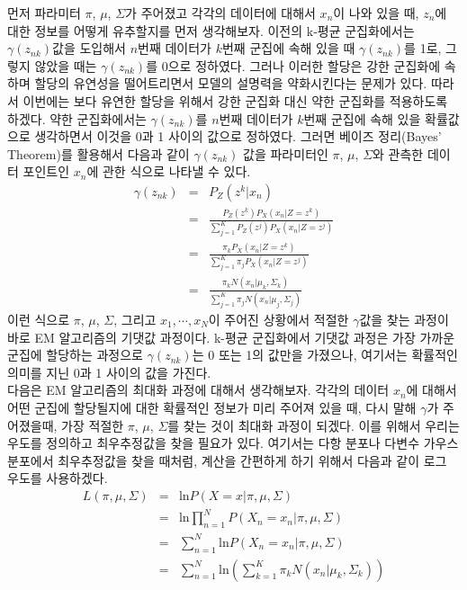\documentclass[a4paper]{oblivoir}
\begin{document}
먼저 파라미터 $\pi$, ${\mu}$, ${\Sigma}$가 주어졌고 각각의 데이터에 대해서 $x_n$이 나와 있을 때, $z_n$에 대한 정보를 어떻게 유추할지를 먼저 생각해보자. 이전의 k-평균 군집화에서는 $\gamma(z_{nk})$값을 도입해서 $n$번째 데이터가 $k$번째 군집에 속해 있을 때 $\gamma(z_{nk})$를 1로, 그렇지 않았을 때는 $\gamma(z_{nk})$를 0으로 정하였다. 그러나 이러한 할당은 강한 군집화에 속하며 할당의 유연성을 떨어트리면서 모델의 설명력을 약화시킨다는 문제가 있다. 따라서 이번에는 보다 유연한 할당을 위해서 강한 군집화 대신 약한 군집화를 적용하도록 하겠다. 약한 군집화에서는 $\gamma(z_{nk})$를 $n$번째 데이터가 $k$번째 군집에 속해 있을 확률값으로 생각하면서 이것을 0과 1 사이의 값으로 정하였다. 그러면 베이즈 정리(Bayes' Theorem)를 활용해서 다음과 같이 $\gamma(z_{nk})$ 값을 파라미터인 $\pi$, ${\mu}$, ${\Sigma}$와 관측한 데이터 포인트인 $x_n$에 관한 식으로 나타낼 수 있다.  
\begin{eqnarray}
\gamma(z_{nk}) & = & P_{Z}(z^{k}|x_{n}) \nonumber \\ 
& = & \frac{ P_{Z}(z^{k})P_{X}(x_{n}|Z=z^{k}) }{ \sum_{j=1}^{K} P_{Z}(z^{j})P_{X}(x_{n}|Z=z^{j}) } \nonumber \\ 
& = & \frac{ \pi_{k} P_{X}(x_{n}|Z=z^{k}) }{ \sum_{j=1}^{K} \pi_{j} P_{X}(x_{n}|Z=z^{j}) } \nonumber \\ 
& = & \frac{ \pi_{k} N(x_{n}|{\mu}_{k}, {\Sigma}_{k}) }{ \sum_{j=1}^{K} \pi_{j} N(x_{n}|{\mu}_{j}, {\Sigma}_{j}) } \label{eq:8-25} 
\end{eqnarray} 
이런 식으로 $\pi$, ${\mu}$, ${\Sigma}$, 그리고 $x_1,\cdots,x_N$이 주어진 상황에서 적절한 $\gamma$값을 찾는 과정이 바로 EM 알고리즘의 기댓값 과정이다. k-평균 군집화에서 기댓값 과정은 가장 가까운 군집에 할당하는 과정으로 $\gamma(z_{nk})$는 0 또는 1의 값만을 가졌으나, 여기서는 확률적인 의미를 지닌 0과 1 사이의 값을 가진다. \\  

다음은 EM 알고리즘의 최대화 과정에 대해서 생각해보자. 각각의 데이터 $x_n$에 대해서 어떤 군집에 할당될지에 대한 확률적인 정보가 미리 주어져 있을 때, 다시 말해 $\gamma$가 주어졌을때, 가장 적절한 $\pi$, ${\mu}$, ${\Sigma}$를 찾는 것이 최대화 과정이 되겠다. 이를 위해서 우리는 우도를 정의하고 최우추정값을 찾을 필요가 있다. 여기서는 다항 분포나 다변수 가우스 분포에서 최우추정값을 찾을 때처럼, 계산을 간편하게 하기 위해서 다음과 같이 로그 우도를 사용하겠다. 
\begin{eqnarray}
L(\pi, \mu, \Sigma) & = & \textrm{ln} P(X=x|\pi, \mu, \Sigma)  \nonumber \\ 
& = & \textrm{ln} \prod_{n=1}^{N} P(X_n=x_n|\pi, \mu, \Sigma)  \nonumber \\ 
& = & \sum_{n=1}^{N} \textrm{ln} P(X_n=x_n|\pi, \mu, \Sigma)  \nonumber \\ 
& = & \sum_{n=1}^{N} \textrm{ln}( \sum_{k=1}^{K}\pi_{k} N(x_{n}|{\mu}_{k}, {\Sigma}_{k})) \label{eq:8-26} 
\end{eqnarray} 
\end{document}
